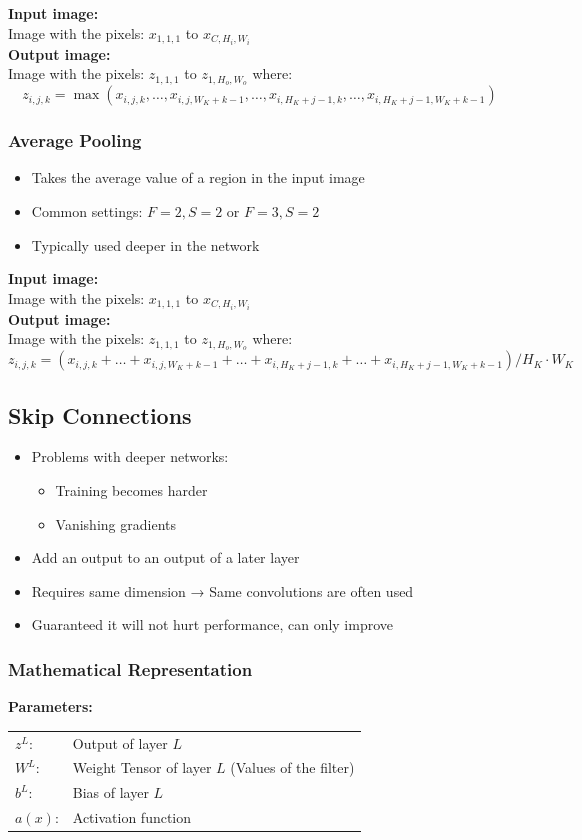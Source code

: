 \documentclass[10pt,a4paper]{article}
\newcommand{\props}{$\circ$}
\newcommand{\iprops}{\item[\props]}
\begin{document}
\textbf{Input image:} \\
Image with the pixels: $x_{1,1,1}$ to $x_{C,H_i,W_i}$ \\

\textbf{Output image:} \\
Image with the pixels: $z_{1,1,1}$ to $z_{1, H_o, W_o}$ where:
$$
	z_{i,j,k} = \max (x_{i,j,k}, \dots, x_{i,j,W_K + k - 1}, \dots, x_{i,H_K + j - 1,k}, \dots, x_{i,H_K + j - 1, W_K + k - 1})
$$

\subsubsection{Average Pooling}
\begin{itemize}
	\item Takes the average value of a region in the input image
	\iprops Common settings: $F = 2, S = 2$ or $F = 3, S = 2$
	\iprops Typically used deeper in the network
\end{itemize}

\textbf{Input image:} \\
Image with the pixels: $x_{1,1,1}$ to $x_{C,H_i,W_i}$ \\

\textbf{Output image:} \\
Image with the pixels: $z_{1,1,1}$ to $z_{1, H_o, W_o}$ where:
$$
	z_{i,j,k} = (x_{i,j,k} + \dots + x_{i,j,W_K + k - 1} + \dots + x_{i,H_K + j - 1,k} + \dots + x_{i,H_K + j - 1, W_K + k - 1}) / H_K ⋅ W_K
$$

\subsection{Skip Connections}
\begin{itemize}
	\item Problems with deeper networks:
	\begin{itemize}
		\item Training becomes harder
		\item Vanishing gradients
	\end{itemize}
	\item Add an output to an output of a later layer
	\iprops Requires same dimension → Same convolutions are often used
	\iprops Guaranteed it will not hurt performance, can only improve
\end{itemize}

\subsubsection{Mathematical Representation}
\textbf{Parameters:} \\
\begin{tabular}{ll}
	$z^L$: & Output of layer $L$ \\
	$W^L$: & Weight Tensor of layer $L$ (Values of the filter) \\
	$b^L$: & Bias of layer $L$ \\
	$a(x)$: & Activation function
\end{tabular}
\end{document}
